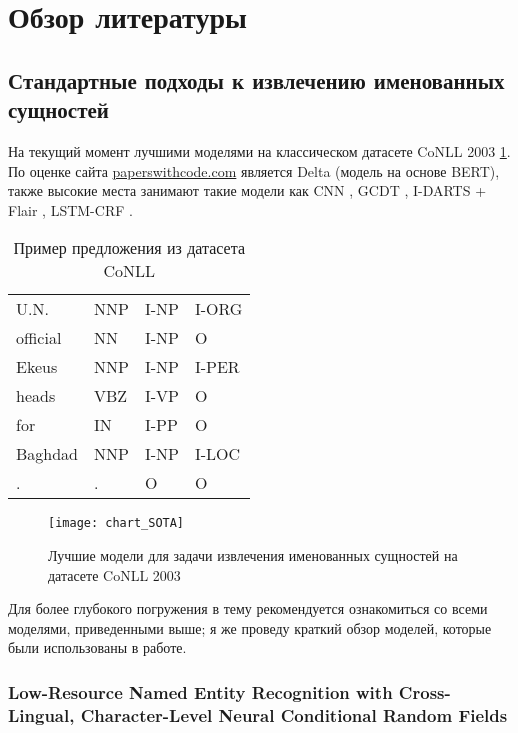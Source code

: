 \section{Обзор литературы}

\subsection{Стандартные подходы к извлечению именованных сущностей}

На текущий момент лучшими моделями на классическом датасете CoNLL 2003 \cite{tjong-kim-sang-de-meulder-2003-introduction} \ref{table:example_CoNLL}. По оценке сайта \href{https://paperswithcode.com/sota/named-entity-recognition-ner-on-conll-2003}{paperswithcode.com} является Delta \cite{delta} (модель на основе BERT), также высокие места занимают такие модели как CNN \cite{CNN_top_2_SOTA}, GCDT \cite{Liu:19}, I-DARTS + Flair \cite{jiang-etal-2019-improved}, LSTM-CRF \cite{strakova-etal-2019-neural}.

\begin{table}[h]
\caption{Пример предложения из датасета CoNLL}
\begin{tabular}{llll}
U.N. & NNP & I-NP & I-ORG \\
official & NN & I-NP & O \\
Ekeus & NNP & I-NP& I-PER \\
heads & VBZ & I-VP & O\\
for & IN & I-PP & O \\
Baghdad & NNP & I-NP & I-LOC \\
. & . & O & O
\end{tabular}
\label{table:example_CoNLL}
\end{table}

\begin{figure}[h]
\texttt{[image: chart\_SOTA]}
\label{fig:chart_SOTA}
\caption{Лучшие модели для задачи извлечения именованных сущностей на датасете CoNLL 2003}
\end{figure}

Для более глубокого погружения в тему рекомендуется ознакомиться со всеми моделями, приведенными выше; я же проведу краткий обзор моделей, которые были использованы в работе.

\subsubsection{Low-Resource Named Entity Recognition with Cross-Lingual, Character-Level Neural Conditional Random Fields}

